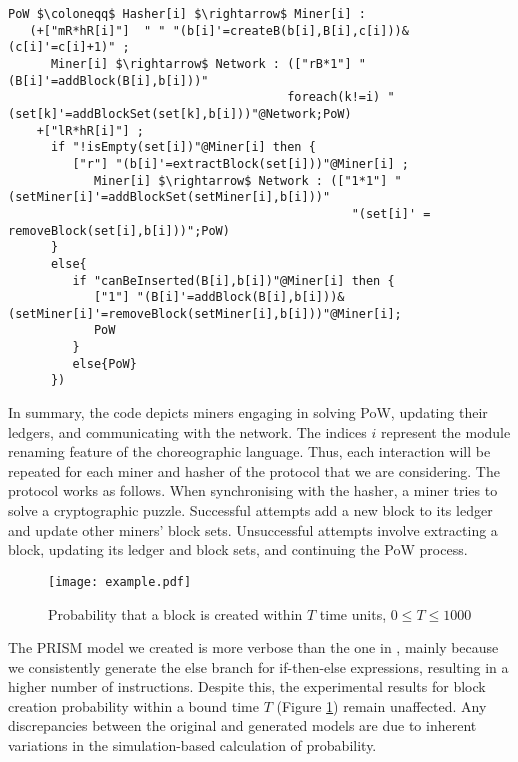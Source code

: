   \begin{lstlisting}[style=chor-color,breaklines=true, postbreak=\mbox{\textcolor{red}{$\hookrightarrow$}\space},caption={Choreography for the Proof of Work Bitcoin Protocol},captionpos=b,label={ex3-code}]
   PoW $\coloneqq$ Hasher[i] $\rightarrow$ Miner[i] :
   (+["mR*hR[i]"]  " " "(b[i]'=createB(b[i],B[i],c[i]))&(c[i]'=c[i]+1)" ; 
      Miner[i] $\rightarrow$ Network : (["rB*1"] "(B[i]'=addBlock(B[i],b[i]))" 
                                       foreach(k!=i) "(set[k]'=addBlockSet(set[k],b[i]))"@Network;PoW)
    +["lR*hR[i]"] ; 
      if "!isEmpty(set[i])"@Miner[i] then { 
         ["r"] "(b[i]'=extractBlock(set[i]))"@Miner[i] ;  
            Miner[i] $\rightarrow$ Network : (["1*1"] "(setMiner[i]'=addBlockSet(setMiner[i],b[i]))" 
                                                "(set[i]' = removeBlock(set[i],b[i]))";PoW) 
      }
      else{
         if "canBeInserted(B[i],b[i])"@Miner[i] then { 
            ["1"] "(B[i]'=addBlock(B[i],b[i]))&(setMiner[i]'=removeBlock(setMiner[i],b[i]))"@Miner[i];
            PoW 
         }
         else{PoW}
      })
   \end{lstlisting}

   In summary, the code depicts miners engaging in
   solving PoW, updating their ledgers, and communicating with the
   network.  The indices $i$ represent the module renaming feature of
   the choreographic language. Thus, each interaction will be repeated
   for each miner and hasher of the protocol that we are
   considering. The protocol works as follows. 
   When synchronising with
   the hasher, a miner tries to solve a cryptographic
   puzzle. Successful attempts add a new block to its ledger and update other miners' block sets. Unsuccessful attempts involve extracting a block, updating its ledger and block sets, and continuing the PoW process.

  \begin{figure}[h]
   \centering
   \texttt{[image: example.pdf]}	
   \caption{Probability that a block is created within $T$ time units, $0\leq T\leq 1000$}
   \label{ex3-res}
\end{figure}
The PRISM model we created is more verbose than the one in \cite{DBLP:journals/concurrency/BistarelliNGLMV23}, mainly because we consistently generate the else branch for if-then-else expressions, resulting in a higher number of instructions. Despite this, the experimental results for block creation probability within a bound time $T$ (Figure \ref{ex3-res}) remain unaffected. Any discrepancies between the original and generated models are due to inherent variations in the simulation-based calculation of probability.


